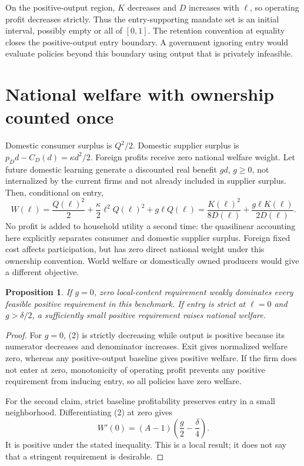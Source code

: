 \documentclass[11pt]{article}
\newtheorem{proposition}{Proposition}
\begin{document}
On the positive-output region, $K$ decreases and $D$ increases with $\ell$, so operating profit decreases strictly. Thus the entry-supporting mandate set is an initial interval, possibly empty or all of $[0,1]$. The retention convention at equality closes the positive-output entry boundary. A government ignoring entry would evaluate policies beyond this boundary using output that is privately infeasible.

\section*{National welfare with ownership counted once}
Domestic consumer surplus is $Q^2/2$. Domestic supplier surplus is
$p_Dd-C_D(d)=\kappa d^2/2$. Foreign profits receive zero national welfare weight. Let future domestic learning generate a discounted real benefit $g d$, $g\geq0$, not internalized by the current firms and not already included in supplier surplus. Then, conditional on entry,
\[
 W(\ell)=\frac{Q(\ell)^2}{2}+
          \frac\kappa2\ell^2Q(\ell)^2+g\ell Q(\ell)
 =\frac{K(\ell)^2}{8D(\ell)}+
   \frac{g\ell K(\ell)}{2D(\ell)}. \tag{2}
\]
No profit is added to household utility a second time: the quasilinear accounting here explicitly separates consumer and domestic supplier surplus. Foreign fixed cost affects participation, but has zero direct national weight under this ownership convention. World welfare or domestically owned producers would give a different objective.

\begin{proposition}
If $g=0$, zero local-content requirement weakly dominates every feasible positive requirement in this benchmark. If entry is strict at $\ell=0$ and $g>\delta/2$, a sufficiently small positive requirement raises national welfare.
\end{proposition}
\begin{proof}
For $g=0$, (2) is strictly decreasing while output is positive because its numerator decreases and denominator increases. Exit gives normalized welfare zero, whereas any positive-output baseline gives positive welfare. If the firm does not enter at zero, monotonicity of operating profit prevents any positive requirement from inducing entry, so all policies have zero welfare.

For the second claim, strict baseline profitability preserves entry in a small neighborhood. Differentiating (2) at zero gives
\[
 W'(0)=(A-1)\left(\frac g2-\frac\delta4\right).
\]
It is positive under the stated inequality. This is a local result; it does not say that a stringent requirement is desirable.
\end{proof}
\end{document}
